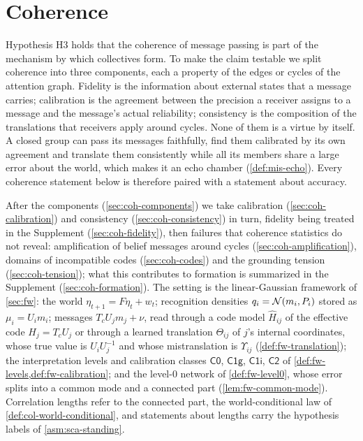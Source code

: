 \section{Coherence}\label{sec:coh}

Hypothesis H3 holds that the coherence of message passing is part of the mechanism by which collectives form. To make the claim testable we split coherence into three components, each a property of the edges or cycles of the attention graph. Fidelity is the information about external states that a message carries; calibration is the agreement between the precision a receiver assigns to a message and the message's actual reliability; consistency is the composition of the translations that receivers apply around cycles. None of them is a virtue by itself. A closed group can pass its messages faithfully, find them calibrated by its own agreement and translate them consistently while all its members share a large error about the world, which makes it an echo chamber (\cref{def:mis-echo}). Every coherence statement below is therefore paired with a statement about accuracy.

After the components (\cref{sec:coh-components}) we take calibration (\cref{sec:coh-calibration}) and consistency (\cref{sec:coh-consistency}) in turn, fidelity being treated in the Supplement (\cref{sec:coh-fidelity}), then failures that coherence statistics do not reveal: amplification of belief messages around cycles (\cref{sec:coh-amplification}), domains of incompatible codes (\cref{sec:coh-codes}) and the grounding tension (\cref{sec:coh-tension}); what this contributes to formation is summarized in the Supplement (\cref{sec:coh-formation}). The setting is the linear-Gaussian framework of \cref{sec:fw}: the world $\eta_{t+1}=F\eta_t+w_t$; recognition densities $q_i=\mathcal{N}(m_i,P_i)$ stored as $\mu_i=U_im_i$; messages $T_cU_jm_j+\nu$, read through a code model $\hat H_{ij}$ of the effective code $H_j=T_cU_j$ or through a learned translation $\Theta_{ij}$ of $j$'s internal coordinates, whose true value is $U_iU_j^{-1}$ and whose mistranslation is $\Upsilon_{ij}$ (\cref{def:fw-translation}); the interpretation levels and calibration classes $\mathsf{C0}$, $\mathsf{C1g}$, $\mathsf{C1i}$, $\mathsf{C2}$ of \cref{def:fw-levels,def:fw-calibration}; and the level-0 network of \cref{def:fw-level0}, whose error splits into a common mode and a connected part (\cref{lem:fw-common-mode}). Correlation lengths refer to the connected part, the world-conditional law of \cref{def:col-world-conditional}, and statements about lengths carry the hypothesis labels of \cref{asm:sca-standing}.

